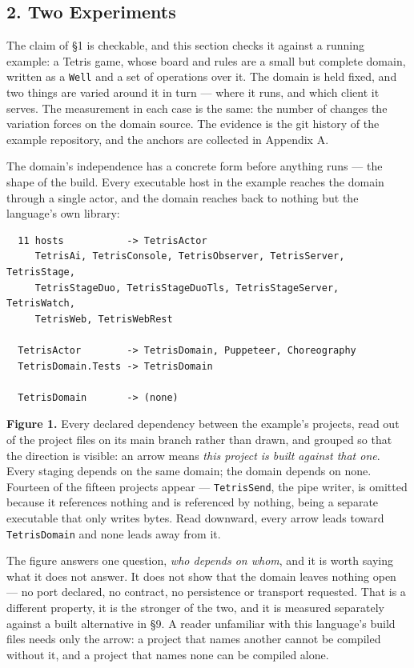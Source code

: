 \documentclass[
]{article}
\newcounter{none} %
\begin{document}
\subsection{2. Two Experiments}\label{two-experiments}

The claim of §1 is checkable, and this section checks it against a
running example: a Tetris game, whose board and rules are a small but
complete domain, written as a \texttt{Well} and a set of operations over
it. The domain is held fixed, and two things are varied around it in
turn --- where it runs, and which client it serves. The measurement in
each case is the same: the number of changes the variation forces on the
domain source. The evidence is the git history of the example
repository, and the anchors are collected in Appendix A.

The domain's independence has a concrete form before anything runs ---
the shape of the build. Every executable host in the example reaches the
domain through a single actor, and the domain reaches back to nothing
but the language's own library:

\begin{verbatim}
  11 hosts           -> TetrisActor
     TetrisAi, TetrisConsole, TetrisObserver, TetrisServer, TetrisStage,
     TetrisStageDuo, TetrisStageDuoTls, TetrisStageServer, TetrisWatch,
     TetrisWeb, TetrisWebRest

  TetrisActor        -> TetrisDomain, Puppeteer, Choreography
  TetrisDomain.Tests -> TetrisDomain

  TetrisDomain       -> (none)
\end{verbatim}

\textbf{Figure 1.} Every declared dependency between the example's
projects, read out of the project files on its main branch rather than
drawn, and grouped so that the direction is visible: an arrow means
\emph{this project is built against that one}. Every staging depends on
the same domain; the domain depends on none. Fourteen of the fifteen
projects appear --- \texttt{TetrisSend}, the pipe writer, is omitted
because it references nothing and is referenced by nothing, being a
separate executable that only writes bytes. Read downward, every arrow
leads toward \texttt{TetrisDomain} and none leads away from it.

The figure answers one question, \emph{who depends on whom}, and it is
worth saying what it does not answer. It does not show that the domain
leaves nothing open --- no port declared, no contract, no persistence or
transport requested. That is a different property, it is the stronger of
the two, and it is measured separately against a built alternative in
§9. A reader unfamiliar with this language's build files needs only the
arrow: a project that names another cannot be compiled without it, and a
project that names none can be compiled alone.
\end{document}
